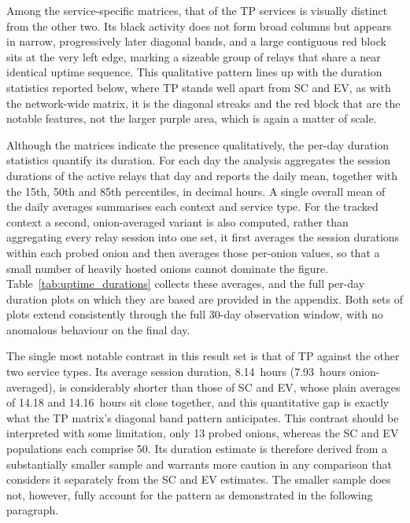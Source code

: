 \documentclass[conference]{IEEEtran}
\begin{document}
Among the service-specific matrices, that of the TP services is visually distinct from the other two. Its black activity does not form broad columns 
but appears in narrow, progressively later diagonal bands, and a large contiguous red block sits at the very left edge, marking a sizeable group 
of relays that share a near identical uptime sequence. This qualitative pattern lines up with the duration statistics reported below, where TP stands 
well apart from SC and EV, as with the network-wide matrix, it is the diagonal streaks and the red block that are the notable features, not the larger 
purple area, which is again a matter of scale.

Although the matrices indicate the presence qualitatively, the per-day duration statistics quantify its duration. For each day the analysis aggregates the session 
durations of the active relays that day and reports the daily mean, together with the 15th, 50th and 85th percentiles, in decimal hours. A single 
overall mean of the daily averages summarises each context and service type. For the tracked context a second, onion-averaged variant is also 
computed, rather than aggregating every relay session into one set, it first averages the session durations within each probed onion and then averages 
those per-onion values, so that a small number of heavily hosted onions cannot dominate the figure. Table~\ref{tab:uptime_durations} collects these 
averages, and the full per-day duration plots on which they are based are provided in the appendix. Both sets of plots extend 
consistently through the full 30-day observation window, with no anomalous behaviour on the final day.
 
The single most notable contrast in this result set is that of TP against the other two service types. Its average session duration, 8.14~hours 
(7.93~hours onion-averaged), is considerably shorter than those of SC and EV, whose plain averages of 14.18 and 14.16~hours sit close together, and this 
quantitative gap is exactly what the TP matrix's diagonal band pattern anticipates. This contrast should be interpreted with some limitation, only 13 probed 
onions, whereas the SC and EV populations each comprise 50. Its duration estimate is therefore derived from a substantially smaller sample and warrants more 
caution in any comparison that considers it separately from the SC and EV estimates. The smaller sample does not, however, fully account for the pattern as 
demonstrated in the following paragraph.
 
\end{document}
